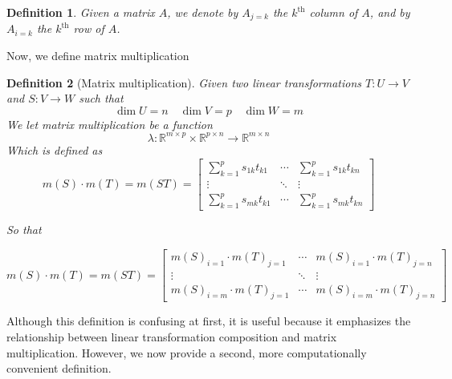 \documentclass{book}
\newtheorem{definition}{Definition}[section]
\begin{document}
\begin{definition}
    Given a matrix $A$, we denote by $A_{j=k}$ the $k^{\text{th}}$ column of $A$, and by $A_{i=k}$ the $k^{\text{th}}$ row of $A$.
\end{definition}

Now, we define matrix multiplication

\begin{definition}[Matrix multiplication]
    Given two linear transformations $T: U \to V$ and $S: V \to W$ such that
    \begin{equation*}
        \dim U = n\quad\dim V = p\quad\dim W = m
    \end{equation*}
    We let matrix multiplication be a function
    \begin{equation*}
        \lambda: \mathbb{R}^{m \times p} \times \mathbb{R}^{p \times n} \to \mathbb{R}^{m \times n}    \end{equation*}
    Which is defined as
    \begin{equation*}
        m(S) \cdot m(T) = m(ST) = \left[\begin{matrix}
                \sum_{k=1}^{p}{s_{1k} t_{k1}} & \cdots & \sum_{k=1}^{p}{s_{1k} t_{kn}} \\
                \vdots                        & \ddots & \vdots                        \\
                \sum_{k=1}^{p}{s_{mk} t_{k1}} & \cdots & \sum_{k=1}^{p}{s_{mk} t_{kn}}
            \end{matrix}\right]
    \end{equation*}

    So that

    \begin{equation*}
        m(S) \cdot m(T) = m(ST) = \left[\begin{matrix}
                m(S)_{i=1}\cdot m(T)_{j=1} & \cdots & m(S)_{i=1}\cdot m(T)_{j=n} \\
                \vdots                     & \ddots & \vdots                     \\
                m(S)_{i=m}\cdot m(T)_{j=1} & \cdots & m(S)_{i=m}\cdot m(T)_{j=n}
            \end{matrix}\right]
    \end{equation*}
\end{definition}

Although this definition is confusing at first, it is useful because it
emphasizes the relationship between linear transformation composition and
matrix multiplication. However, we now provide a second, more computationally
convenient definition.
\end{document}

